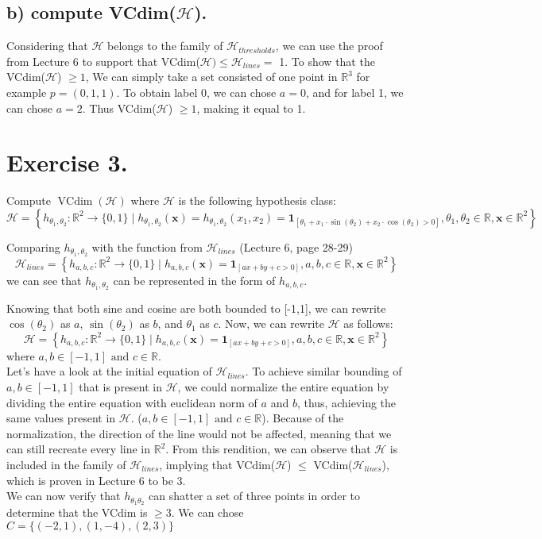 \documentclass[11pt, a4paper]{article}
\begin{document}
\begin{large}
\subsection{b) compute VCdim($\mathcal{H}$).}
Considering that $\mathcal{H}$ belongs to the family of $\mathcal{H}_{thresholds}$, we can use the proof from Lecture 6 to support that VCdim($\mathcal{H}) \leq \mathcal{H}_{lines}  =$  1. To show that the VCdim($\mathcal{H}$) $\geq 1$, We can simply take a set consisted of one point in $\mathbb{R}^3$ for example $p=(0,1,1)$. To obtain label 0, we can chose $a = 0$, and for label 1, we can chose $a = 2$. Thus VCdim($\mathcal{H}$) $\geq 1$, making it equal to 1.



\section{Exercise 3.}
Compute $\operatorname{VCdim}(\mathcal{H})$ where $\mathcal{H}$ is the following hypothesis class:
$$
\mathcal{H}=\left\{h_{\theta_1, \theta_2}: \mathbb{R}^2 \rightarrow\{0,1\} \mid h_{\theta_1, \theta_2}(\mathbf{x})=h_{\theta_1, \theta_2}\left(x_1, x_2\right)=\mathbf{1}_{\left[\theta_1+x_1 \cdot \sin \left(\theta_2\right)+x_2 \cdot \cos \left(\theta_2\right)>0\right]}, \theta_1, \theta_2 \in \mathbb{R}, \mathbf{x} \in \mathbb{R}^2\right\}
$$

Comparing $h_{\theta_1, \theta_2}$ with the function from $\mathcal{H}_{lines}$ (Lecture 6, page 28-29) $$\mathcal{H}_{lines}=\left\{h_{a, b, c}: \mathbb{R}^2 \rightarrow\{0,1\} \mid h_{a, b, c}(\mathbf{x})=\mathbf{1}_{[a x+b y+c>0]}, a, b, c \in \mathbb{R}, \mathbf{x} \in \mathbb{R}^2\right\}$$we can see that $h_{\theta_1, \theta_2}$ can be represented in the form of $h_{a,b,c}$.

Knowing that both sine and cosine are both bounded to [-1,1], we can rewrite $\cos(\theta_2) $ as $a$, $\sin(\theta_2) $ as $ b$, and $\theta_1 $ as $ c $. Now, we can rewrite $\mathcal{H}$ as follows:
$$\mathcal{H}=\left\{h_{a, b, c}: \mathbb{R}^2 \rightarrow\{0,1\} \mid h_{a, b, c}(\mathbf{x})=\mathbf{1}_{[a x+b y+c>0]}, a, b, c \in \mathbb{R}, \mathbf{x} \in \mathbb{R}^2\right\}$$
where $a,b \in [-1,1] \text{ and } c \in \mathbb{R}$. \\ Let's have a look at the initial equation of $\mathcal{H}_{lines}$. To achieve similar bounding of $a,b \in [-1,1]$ that is present in $\mathcal{H}$, we could normalize the entire equation by dividing the entire equation with euclidean norm of $a$ and $b$, thus, achieving the same values present in  $\mathcal{H}$. ($a,b \in [-1,1] \text{ and } c \in \mathbb{R}$). Because of the normalization, the direction of the line would not be affected, meaning that we can still recreate every line in $\mathbb{R}^2$. From this rendition, we can observe that $\mathcal{H}$ is included in the family of $\mathcal{H}_{lines}$, implying that VCdim($\mathcal{H}$) $\leq$  VCdim($\mathcal{H}_{lines}$), which is proven in Lecture 6 to be 3.\\ 
We can now verify that $h_{\theta_1 \theta_2}$ can shatter a set of three points in order to determine that the VCdim is $\geq 3$.
We can chose $C = \{(-2, 1), (1, -4), (2, 3)\}$


\end{large}
\end{document}
